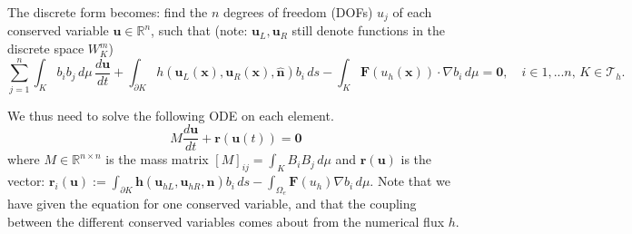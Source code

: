 \documentclass[11pt]{article}
\let\bld\boldsymbol
\begin{document}
The discrete form becomes: find the $n$ degrees of freedom (DOFs) $u_j$ of each conserved variable $\mathbf{u} \in \mathbb{R}^n$, such that (note: $\bld{u}_L, \bld{u}_R$ still denote functions in the discrete space $W_{K}^m$)
\begin{equation}
\sum_{j=1}^n\int_{K} b_ib_j\,d\mu\, \frac{d\mathbf{u}}{d t} + \int_{\partial K}  h(\bld{u}_L(\bld{x}), \bld{u}_R(\bld{x}), \hat{\bld{n}})b_i \,ds - \int_{K}\bld{F}(u_h(\bld{x}))\cdot\nabla b_i \,d\mu = \bld{0}, \quad i \in {1,...n},\, K \in \mathcal{T}_h.
\label{df}
\end{equation}

We thus need to solve the following ODE on each element.
\begin{equation}
M \frac{d\mathbf{u}}{dt} + \bld{r}(\mathbf{u}(t)) = \bld{0}
\label{ode}
\end{equation}
where $M \in \mathbb{R}^{n\times n}$ is the mass matrix $[M]_{ij} = \int_{K} B_iB_j\,d\mu$ and $\bld{r}(\mathbf{u})$ is the vector: $\bld{r}_i(\mathbf{u}) :=  \int_{\partial K}  \bld{h}(\bld{u}_{hL}, \bld{u}_{hR}, \hat{\bld{n}})b_i \,ds - \int_{\Omega_e}\bld{F}(u_h)\nabla b_i \,d\mu$. Note that we have given the equation for one conserved variable, and that the coupling between the different conserved variables comes about from the numerical flux $h$.
\end{document}
